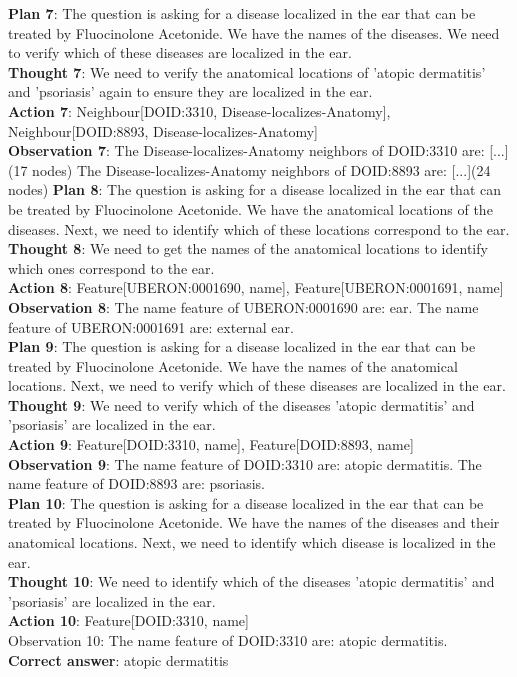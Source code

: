 \documentclass[11pt]{article}
\begin{document}
\begin{tcolorbox}[colback=white!10!white, colframe=blue!30!black, title=, boxrule=1pt, fontupper={\fontsize{7pt}{9pt}\selectfont}]
\textbf{Plan 7}: The question is asking for a disease localized in the ear that can be treated by Fluocinolone Acetonide. We have the names of the diseases. We need to verify which of these diseases are localized in the ear.\\
\textbf{Thought 7}: We need to verify the anatomical locations of 'atopic dermatitis' and 'psoriasis' again to ensure they are localized in the ear.\\
\textbf{Action 7}: Neighbour[DOID:3310, Disease-localizes-Anatomy], Neighbour[DOID:8893, Disease-localizes-Anatomy]\\
\textbf{Observation 7}: The Disease-localizes-Anatomy neighbors of DOID:3310 are: [...](17 nodes) The Disease-localizes-Anatomy neighbors of DOID:8893 are: [...](24 nodes)
\textbf{Plan 8}: The question is asking for a disease localized in the ear that can be treated by Fluocinolone Acetonide. We have the anatomical locations of the diseases. Next, we need to identify which of these locations correspond to the ear.\\
\textbf{Thought 8}: We need to get the names of the anatomical locations to identify which ones correspond to the ear.\\
\textbf{Action 8}: Feature[UBERON:0001690, name], Feature[UBERON:0001691, name]\\
\textbf{Observation 8}: The name feature of UBERON:0001690 are: ear. The name feature of UBERON:0001691 are: external ear. \\
\textbf{Plan 9}: The question is asking for a disease localized in the ear that can be treated by Fluocinolone Acetonide. We have the names of the anatomical locations. Next, we need to verify which of these diseases are localized in the ear.\\
\textbf{Thought 9}: We need to verify which of the diseases 'atopic dermatitis' and 'psoriasis' are localized in the ear.\\
\textbf{Action 9}: Feature[DOID:3310, name], Feature[DOID:8893, name]\\
\textbf{Observation 9}: The name feature of DOID:3310 are: atopic dermatitis. The name feature of DOID:8893 are: psoriasis. \\
\textbf{Plan 10}: The question is asking for a disease localized in the ear that can be treated by Fluocinolone Acetonide. We have the names of the diseases and their anatomical locations. Next, we need to identify which disease is localized in the ear.\\
\textbf{Thought 10}: We need to identify which of the diseases 'atopic dermatitis' and 'psoriasis' are localized in the ear.\\
\textbf{Action 10}: Feature[DOID:3310, name]\\
Observation 10: The name feature of DOID:3310 are: atopic dermatitis.\\
\textbf{Correct answer}: atopic dermatitis\\
\end{tcolorbox}
\end{document}
